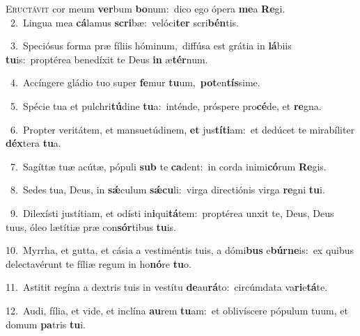 \lettrine{\initial\textcolor{\initialcolor}{E}}{ructávit} cor meum \textbf{ver}\-bum \textbf{bo}\-num:~\star dico ego ópera \textbf{me}\-a \textbf{Re}\-gi.\\
{\numbfont\textcolor{\numbcolor}{~2.}}~Lingua mea \textbf{cá}\-lamus \textbf{scri}\-bæ:~\star velóci\textbf{ter} scri\-\textbf{bén}\-tis.\par
{\numbfont\textcolor{\numbcolor}{~3.}}~Speciósus forma præ fíliis hóminum,~\dagger diffúsa est grátia in \textbf{lá}\-biis \textbf{tu}\-is:~\star proptérea benedíxit te Deus \textbf{in} æ\-\textbf{tér}\-num.\par
{\numbfont\textcolor{\numbcolor}{~4.}}~Accíngere gládio tuo super \textbf{fe}\-mur \textbf{tu}\-um,~\star \textbf{pot}\-en\-\textbf{tís}\-sime.\par
{\numbfont\textcolor{\numbcolor}{~5.}}~Spécie tua et pulchri\-\textbf{tú}\-dine \textbf{tu}\-a:~\star inténde, próspere pro\-\textbf{cé}\-de, et \textbf{re}\-gna.\par
{\numbfont\textcolor{\numbcolor}{~6.}}~Propter veritátem, et mansuetúdinem, \textbf{et} jus\-\textbf{tí}\-\textbf{ti}am:~\star et dedúcet te mirabíliter \textbf{déx}\-tera \textbf{tu}\-a.\par
{\numbfont\textcolor{\numbcolor}{~7.}}~Sagíttæ tuæ acútæ, pópuli \textbf{sub} te \textbf{ca}\-dent:~\star in corda inimi\-\textbf{có}\-rum \textbf{Re}\-gis.\par
{\numbfont\textcolor{\numbcolor}{~8.}}~Sedes tua, Deus, in \textbf{sǽ}\-culum \textbf{sǽ}\-\textbf{cu}li:~\star virga directiónis virga \textbf{re}\-gni \textbf{tu}\-i.\par
{\numbfont\textcolor{\numbcolor}{~9.}}~Dilexísti justítiam, et odísti in\-\textbf{i}\-qui\-\textbf{tá}\-tem:~\star proptérea unxit te, Deus, Deus tuus, óleo lætítiæ præ con\-\textbf{sór}\-tibus \textbf{tu}\-is.\par
{\numbfont\textcolor{\numbcolor}{10.}}~Myrrha, et gutta, et cásia a vestiméntis tuis, a dómi\textbf{bus} e\-\textbf{búr}\-\textbf{ne}is:~\star ex quibus delectavérunt te fíliæ regum in ho\-\textbf{nó}\-re \textbf{tu}\-o.\par
{\numbfont\textcolor{\numbcolor}{11.}}~Astitit regína a dextris tuis in vestítu \textbf{de}\-au\-\textbf{rá}\-to:~\star circúmdata va\-\textbf{ri}\-e\-\textbf{tá}\-te.\par
{\numbfont\textcolor{\numbcolor}{12.}}~Audi, fília, et vide, et inclína \textbf{au}\-rem \textbf{tu}\-am:~\star et oblivíscere pópulum tuum, et domum \textbf{pa}\-tris \textbf{tu}\-i.\par
